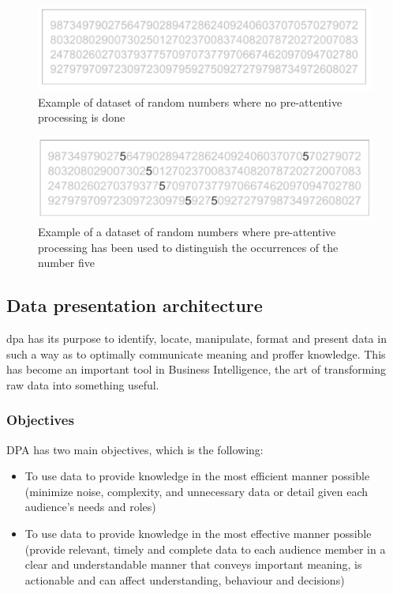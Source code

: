 \begin{figure}[h!]
\includegraphics[scale=0.3]{attentive}
\caption{Example of dataset of random numbers where no pre-attentive processing is done}
\end{figure}

\begin{figure}[h!]
\includegraphics[scale=0.3]{pre_attentive}
\caption{Example of a dataset of random numbers where pre-attentive processing has been used to distinguish the occurrences of the number five}
\end{figure}
\subsection{Data presentation architecture}
\label{sec:dpa}
\gls{dpa} has its purpose to identify, locate, manipulate, format and present data in such a way as to optimally communicate meaning and proffer knowledge\cite{wiki_data_viz}. This has become an important tool in Business Intelligence, the art of transforming raw data into something useful. 

\subsubsection{Objectives}
DPA has two main objectives, which is the following:

\begin{itemize}
\item To use data to provide knowledge in the most efficient manner possible (minimize noise, complexity, and unnecessary data or detail given each audience's needs and roles)
\item To use data to provide knowledge in the most effective manner possible (provide relevant, timely and complete data to each audience member in a clear and understandable manner that conveys important meaning, is actionable and can affect understanding, behaviour and decisions)
\end{itemize}

